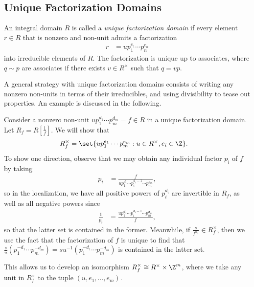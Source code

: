 \documentclass[10pt]{mypackage}
\begin{document}
\subsection{Unique Factorization Domains}%
\begin{definition}
  An integral domain $R$ is called a \textit{unique factorization domain} if every element $r\in R$ that is nonzero and non-unit admits a factorization
  \begin{align*}
    r &= up_1^{e_1}\cdots p_n^{e_n}
  \end{align*}
  into irreducible elements of $R$. The factorization is unique up to associates, where $q\sim p$ are associates if there exists $v\in R^{\times}$ such that $q = vp$.
\end{definition}
A general strategy with unique factorization domains consists of writing any nonzero non-units in terms of their irreducibles, and using divisibility to tease out properties. An example is discussed in the following.
\begin{example}
  Consider a nonzero non-unit $up_1^{d_1}\cdots p_m^{d_m} = f\in R$ in a unique factorization domain. Let $R_f = R\left[ \frac{1}{f} \right]$. We will show that
  \begin{align*}
    R_f^{\times} &= \set{up_1^{e_1}\cdots p_m^{e_m} : u\in R^{\times}, e_i\in \Z}.
  \end{align*}
  To show one direction, observe that we may obtain any individual factor $p_i$ of $f$ by taking
  \begin{align*}
    p_i &= \frac{f}{up_1^{d_1}\cdots p_i^{d_{i}-1}\cdots p_m^{d_m}},
  \end{align*}
  so in the localization, we have all positive powers of $p_i^{d_i}$ are invertible in $R_f$, as well as all negative powers since
  \begin{align*}
    \frac{1}{p_i} &= \frac{up_1^{d_1}\cdots p_i^{d_{i}-1}\cdots p_m^{d_m}}{f},
  \end{align*}
  so that the latter set is contained in the former. Meanwhile, if $\frac{s}{f^{n_1}}\in R_f^{\times}$, then we use the fact that the factorization of $f$ is unique to find that $\frac{s}{u}\left( p_1^{-d_1}\cdots p_m^{-d_m} \right) = su^{-1}\left( p_1^{-d_1}\cdots p_m^{-d_m} \right)$ is contained in the latter set.

  This allows us to develop an isomorphism $R_f^{\times}\cong R^{\times}\times \Z^{m}$, where we take any unit in $R_f^{\times}$ to the tuple $\left( u,e_1,\dots,e_m \right)$.
\end{example}
\end{document}
